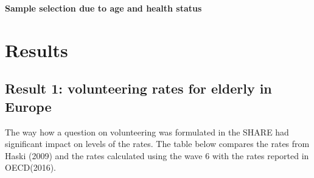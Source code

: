 \documentclass[10pt, letterpaper]{article}
\begin{document}
\begin{spacing}{1.4}
\textbf{Sample selection due to age and health status }\\

\section{Results}

\subsection{Result 1: volunteering rates for elderly in Europe}

The way how a question on volunteering was formulated in the SHARE had significant impact on levels of the rates. The table below compares the rates from Haski (2009) and the rates calculated using the wave 6 with the rates reported in OECD(2016).


\begin{spacing}{.9}
	 
      \label{OECDSHARE} 
\end{spacing}


\end{spacing}
\end{document}
